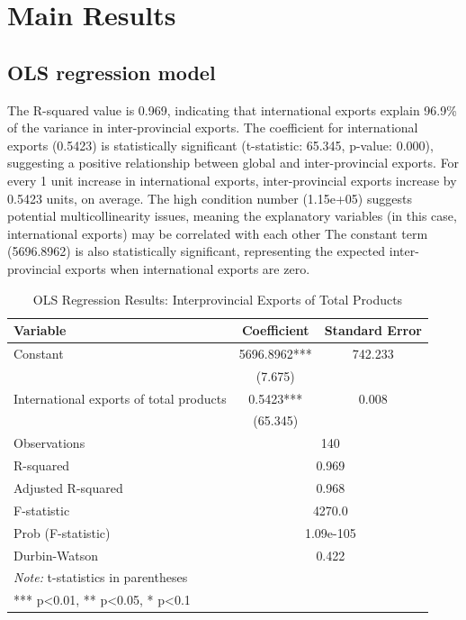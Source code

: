 \documentclass[12pt]{article}
\begin{document}
\section*{ Main Results}{
\subsection*{OLS regression model}{
The R-squared value is 0.969, indicating that international exports explain 96.9\% of the variance in inter-provincial exports.
The coefficient for international exports (0.5423) is statistically significant (t-statistic: 65.345, p-value: 0.000), suggesting a positive relationship between global and inter-provincial exports.
For every 1 unit increase in international exports, inter-provincial exports increase by 0.5423 units, on average. The high condition number (1.15e+05) suggests potential multicollinearity issues, meaning the explanatory variables (in this case, international exports) may be correlated with each other
The constant term (5696.8962) is also statistically significant, representing the expected inter-provincial exports when international exports are zero.
}


\begin{table}[htbp]
\centering
\caption{OLS Regression Results: Interprovincial Exports of Total Products}
\label{tab:ols_results}
\begin{tabular}{lcc}
\toprule
\textbf{Variable} & \textbf{Coefficient} & \textbf{Standard Error} \\
\midrule
Constant & 5696.8962*** & 742.233 \\
 & (7.675) & \\
International exports of total products & 0.5423*** & 0.008 \\
 & (65.345) & \\
\midrule
Observations & \multicolumn{2}{c}{140} \\
R-squared & \multicolumn{2}{c}{0.969} \\
Adjusted R-squared & \multicolumn{2}{c}{0.968} \\
F-statistic & \multicolumn{2}{c}{4270.0} \\
Prob (F-statistic) & \multicolumn{2}{c}{1.09e-105} \\
Durbin-Watson & \multicolumn{2}{c}{0.422} \\
\bottomrule
\multicolumn{3}{l}{\textit{Note:} t-statistics in parentheses} \\
\multicolumn{3}{l}{*** p<0.01, ** p<0.05, * p<0.1} \\
\end{tabular}
\end{table}

}
\end{document}
